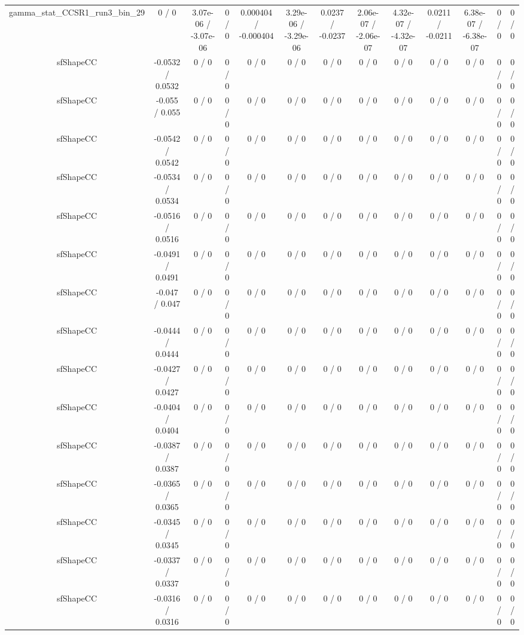\documentclass[10pt]{article}
\begin{document}
\begin{table}[htbp]
\begin{center}
\begin{tabular}{|c|c|c|c|c|c|c|c|c|c|c|c|c|}
  gamma_stat_CCSR1_run3_bin_29 & 0 / 0 & 3.07e-06 / -3.07e-06 & 0 / 0 & 0.000404 / -0.000404 & 3.29e-06 / -3.29e-06 & 0.0237 / -0.0237 & 2.06e-07 / -2.06e-07 & 4.32e-07 / -4.32e-07 & 0.0211 / -0.0211 & 6.38e-07 / -6.38e-07 & 0 / 0 & 0 / 0 \\ 
  sfShapeCC & -0.0532 / 0.0532 & 0 / 0 & 0 / 0 & 0 / 0 & 0 / 0 & 0 / 0 & 0 / 0 & 0 / 0 & 0 / 0 & 0 / 0 & 0 / 0 & 0 / 0 \\ 
  sfShapeCC & -0.055 / 0.055 & 0 / 0 & 0 / 0 & 0 / 0 & 0 / 0 & 0 / 0 & 0 / 0 & 0 / 0 & 0 / 0 & 0 / 0 & 0 / 0 & 0 / 0 \\ 
  sfShapeCC & -0.0542 / 0.0542 & 0 / 0 & 0 / 0 & 0 / 0 & 0 / 0 & 0 / 0 & 0 / 0 & 0 / 0 & 0 / 0 & 0 / 0 & 0 / 0 & 0 / 0 \\ 
  sfShapeCC & -0.0534 / 0.0534 & 0 / 0 & 0 / 0 & 0 / 0 & 0 / 0 & 0 / 0 & 0 / 0 & 0 / 0 & 0 / 0 & 0 / 0 & 0 / 0 & 0 / 0 \\ 
  sfShapeCC & -0.0516 / 0.0516 & 0 / 0 & 0 / 0 & 0 / 0 & 0 / 0 & 0 / 0 & 0 / 0 & 0 / 0 & 0 / 0 & 0 / 0 & 0 / 0 & 0 / 0 \\ 
  sfShapeCC & -0.0491 / 0.0491 & 0 / 0 & 0 / 0 & 0 / 0 & 0 / 0 & 0 / 0 & 0 / 0 & 0 / 0 & 0 / 0 & 0 / 0 & 0 / 0 & 0 / 0 \\ 
  sfShapeCC & -0.047 / 0.047 & 0 / 0 & 0 / 0 & 0 / 0 & 0 / 0 & 0 / 0 & 0 / 0 & 0 / 0 & 0 / 0 & 0 / 0 & 0 / 0 & 0 / 0 \\ 
  sfShapeCC & -0.0444 / 0.0444 & 0 / 0 & 0 / 0 & 0 / 0 & 0 / 0 & 0 / 0 & 0 / 0 & 0 / 0 & 0 / 0 & 0 / 0 & 0 / 0 & 0 / 0 \\ 
  sfShapeCC & -0.0427 / 0.0427 & 0 / 0 & 0 / 0 & 0 / 0 & 0 / 0 & 0 / 0 & 0 / 0 & 0 / 0 & 0 / 0 & 0 / 0 & 0 / 0 & 0 / 0 \\ 
  sfShapeCC & -0.0404 / 0.0404 & 0 / 0 & 0 / 0 & 0 / 0 & 0 / 0 & 0 / 0 & 0 / 0 & 0 / 0 & 0 / 0 & 0 / 0 & 0 / 0 & 0 / 0 \\ 
  sfShapeCC & -0.0387 / 0.0387 & 0 / 0 & 0 / 0 & 0 / 0 & 0 / 0 & 0 / 0 & 0 / 0 & 0 / 0 & 0 / 0 & 0 / 0 & 0 / 0 & 0 / 0 \\ 
  sfShapeCC & -0.0365 / 0.0365 & 0 / 0 & 0 / 0 & 0 / 0 & 0 / 0 & 0 / 0 & 0 / 0 & 0 / 0 & 0 / 0 & 0 / 0 & 0 / 0 & 0 / 0 \\ 
  sfShapeCC & -0.0345 / 0.0345 & 0 / 0 & 0 / 0 & 0 / 0 & 0 / 0 & 0 / 0 & 0 / 0 & 0 / 0 & 0 / 0 & 0 / 0 & 0 / 0 & 0 / 0 \\ 
  sfShapeCC & -0.0337 / 0.0337 & 0 / 0 & 0 / 0 & 0 / 0 & 0 / 0 & 0 / 0 & 0 / 0 & 0 / 0 & 0 / 0 & 0 / 0 & 0 / 0 & 0 / 0 \\ 
  sfShapeCC & -0.0316 / 0.0316 & 0 / 0 & 0 / 0 & 0 / 0 & 0 / 0 & 0 / 0 & 0 / 0 & 0 / 0 & 0 / 0 & 0 / 0 & 0 / 0 & 0 / 0 \\ 

\end{tabular}
\end{center}
\end{table}
\end{document}
